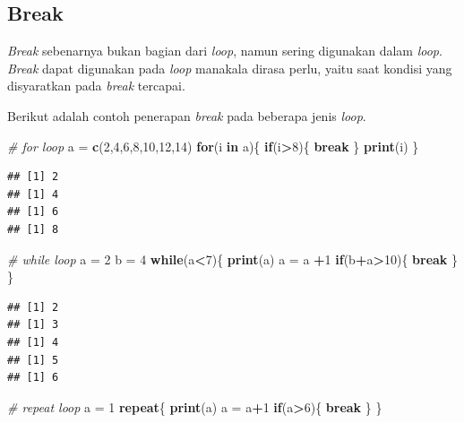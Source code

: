 \documentclass[]{book}
\newenvironment{Shaded}{\begin{snugshade}}{\end{snugshade}}
\newcommand{\KeywordTok}[1]{\textcolor[rgb]{0.13,0.29,0.53}{\textbf{#1}}}
\newcommand{\DecValTok}[1]{\textcolor[rgb]{0.00,0.00,0.81}{#1}}
\newcommand{\StringTok}[1]{\textcolor[rgb]{0.31,0.60,0.02}{#1}}
\newcommand{\CommentTok}[1]{\textcolor[rgb]{0.56,0.35,0.01}{\textit{#1}}}
\newcommand{\ControlFlowTok}[1]{\textcolor[rgb]{0.13,0.29,0.53}{\textbf{#1}}}
\newcommand{\OperatorTok}[1]{\textcolor[rgb]{0.81,0.36,0.00}{\textbf{#1}}}
\newcommand{\NormalTok}[1]{#1}
\begin{document}
\subsection{Break}\label{break}

\emph{Break} sebenarnya bukan bagian dari \emph{loop}, namun sering
digunakan dalam \emph{loop}. \emph{Break} dapat digunakan pada
\emph{loop} manakala dirasa perlu, yaitu saat kondisi yang disyaratkan
pada \emph{break} tercapai.

Berikut adalah contoh penerapan \emph{break} pada beberapa jenis
\emph{loop}.

\begin{Shaded}
\begin{Highlighting}[]
\CommentTok{# for loop}
\NormalTok{a =}\StringTok{ }\KeywordTok{c}\NormalTok{(}\DecValTok{2}\NormalTok{,}\DecValTok{4}\NormalTok{,}\DecValTok{6}\NormalTok{,}\DecValTok{8}\NormalTok{,}\DecValTok{10}\NormalTok{,}\DecValTok{12}\NormalTok{,}\DecValTok{14}\NormalTok{)}
\ControlFlowTok{for}\NormalTok{(i }\ControlFlowTok{in}\NormalTok{ a)\{}
  \ControlFlowTok{if}\NormalTok{(i}\OperatorTok{>}\DecValTok{8}\NormalTok{)\{}
    \ControlFlowTok{break}
\NormalTok{  \}}
  \KeywordTok{print}\NormalTok{(i)}
\NormalTok{\}}
\end{Highlighting}
\end{Shaded}

\begin{verbatim}
## [1] 2
## [1] 4
## [1] 6
## [1] 8
\end{verbatim}

\begin{Shaded}
\begin{Highlighting}[]
\CommentTok{# while loop}
\NormalTok{a =}\StringTok{ }\DecValTok{2}
\NormalTok{b =}\StringTok{ }\DecValTok{4}
\ControlFlowTok{while}\NormalTok{(a}\OperatorTok{<}\DecValTok{7}\NormalTok{)\{}
  \KeywordTok{print}\NormalTok{(a)}
\NormalTok{  a =}\StringTok{ }\NormalTok{a }\OperatorTok{+}\DecValTok{1}
  \ControlFlowTok{if}\NormalTok{(b}\OperatorTok{+}\NormalTok{a}\OperatorTok{>}\DecValTok{10}\NormalTok{)\{}
    \ControlFlowTok{break}
\NormalTok{  \}}
\NormalTok{\}}
\end{Highlighting}
\end{Shaded}

\begin{verbatim}
## [1] 2
## [1] 3
## [1] 4
## [1] 5
## [1] 6
\end{verbatim}

\begin{Shaded}
\begin{Highlighting}[]
\CommentTok{# repeat loop}
\NormalTok{a =}\StringTok{ }\DecValTok{1}
\ControlFlowTok{repeat}\NormalTok{\{}
  \KeywordTok{print}\NormalTok{(a)}
\NormalTok{  a =}\StringTok{ }\NormalTok{a}\OperatorTok{+}\DecValTok{1}
  \ControlFlowTok{if}\NormalTok{(a}\OperatorTok{>}\DecValTok{6}\NormalTok{)\{}
    \ControlFlowTok{break}
\NormalTok{  \}}
\NormalTok{\}}
\end{Highlighting}
\end{Shaded}
\end{document}
